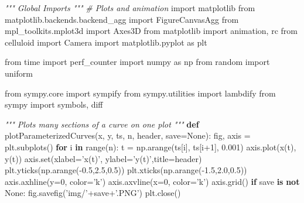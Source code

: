 \documentclass[11pt]{article}
\newenvironment{Shaded}{}{}
\newcommand{\KeywordTok}[1]{\textcolor[rgb]{0.00,0.44,0.13}{\textbf{{#1}}}}
\newcommand{\DecValTok}[1]{\textcolor[rgb]{0.25,0.63,0.44}{{#1}}}
\newcommand{\FloatTok}[1]{\textcolor[rgb]{0.25,0.63,0.44}{{#1}}}
\newcommand{\StringTok}[1]{\textcolor[rgb]{0.25,0.44,0.63}{{#1}}}
\newcommand{\CommentTok}[1]{\textcolor[rgb]{0.38,0.63,0.69}{\textit{{#1}}}}
\newcommand{\NormalTok}[1]{{#1}}
\newcommand{\ImportTok}[1]{{#1}}
\newcommand{\VariableTok}[1]{\textcolor[rgb]{0.10,0.09,0.49}{{#1}}}
\newcommand{\ControlFlowTok}[1]{\textcolor[rgb]{0.00,0.44,0.13}{\textbf{{#1}}}}
\newcommand{\OperatorTok}[1]{\textcolor[rgb]{0.40,0.40,0.40}{{#1}}}
\newcommand{\BuiltInTok}[1]{{#1}}
\begin{document}
\begin{Shaded}
\begin{Highlighting}[]
\CommentTok{""" Global Imports """}
\CommentTok{# Plots and animation}
\ImportTok{import}\NormalTok{ matplotlib}
\ImportTok{from}\NormalTok{ matplotlib.backends.backend_agg }\ImportTok{import}\NormalTok{ FigureCanvasAgg}
\ImportTok{from}\NormalTok{ mpl_toolkits.mplot3d }\ImportTok{import}\NormalTok{ Axes3D}
\ImportTok{from}\NormalTok{ matplotlib }\ImportTok{import}\NormalTok{ animation, rc}
\ImportTok{from}\NormalTok{ celluloid }\ImportTok{import}\NormalTok{ Camera}
\ImportTok{import}\NormalTok{ matplotlib.pyplot }\ImportTok{as}\NormalTok{ plt}

\ImportTok{from}\NormalTok{ time }\ImportTok{import}\NormalTok{ perf_counter}
\ImportTok{import}\NormalTok{ numpy }\ImportTok{as}\NormalTok{ np}
\ImportTok{from}\NormalTok{ random }\ImportTok{import}\NormalTok{ uniform}

\ImportTok{from}\NormalTok{ sympy.core }\ImportTok{import}\NormalTok{ sympify}
\ImportTok{from}\NormalTok{ sympy.utilities }\ImportTok{import}\NormalTok{ lambdify}
\ImportTok{from}\NormalTok{ sympy }\ImportTok{import}\NormalTok{ symbols, diff}

    
\CommentTok{""" Plots many sections of a curve on one plot """}
\KeywordTok{def}\NormalTok{ plotParameterizedCurves(x, y, ts, n, header, save}\OperatorTok{=}\VariableTok{None}\NormalTok{):}
\NormalTok{    fig, axis }\OperatorTok{=}\NormalTok{ plt.subplots()}
    \ControlFlowTok{for}\NormalTok{ i }\KeywordTok{in} \BuiltInTok{range}\NormalTok{(n):}
\NormalTok{        t }\OperatorTok{=}\NormalTok{ np.arange(ts[i], ts[i}\OperatorTok{+}\DecValTok{1}\NormalTok{], }\FloatTok{0.001}\NormalTok{)}
\NormalTok{        axis.plot(x(t), y(t))}
\NormalTok{    axis.}\BuiltInTok{set}\NormalTok{(xlabel}\OperatorTok{=}\StringTok{'x(t)'}\NormalTok{, ylabel}\OperatorTok{=}\StringTok{'y(t)'}\NormalTok{,title}\OperatorTok{=}\NormalTok{header)}
\NormalTok{    plt.yticks(np.arange(}\OperatorTok{-}\FloatTok{0.5}\NormalTok{,}\FloatTok{2.5}\NormalTok{,}\FloatTok{0.5}\NormalTok{))}
\NormalTok{    plt.xticks(np.arange(}\OperatorTok{-}\FloatTok{1.5}\NormalTok{,}\FloatTok{2.0}\NormalTok{,}\FloatTok{0.5}\NormalTok{))}
\NormalTok{    axis.axhline(y}\OperatorTok{=}\DecValTok{0}\NormalTok{, color}\OperatorTok{=}\StringTok{'k'}\NormalTok{)}
\NormalTok{    axis.axvline(x}\OperatorTok{=}\DecValTok{0}\NormalTok{, color}\OperatorTok{=}\StringTok{'k'}\NormalTok{)}
\NormalTok{    axis.grid()}
    \ControlFlowTok{if}\NormalTok{ save }\KeywordTok{is} \KeywordTok{not} \VariableTok{None}\NormalTok{:}
\NormalTok{        fig.savefig(}\StringTok{'img/'}\OperatorTok{+}\NormalTok{save}\OperatorTok{+}\StringTok{'.PNG'}\NormalTok{)}
\NormalTok{        plt.close()}




\end{Highlighting}
\end{Shaded}
\end{document}
